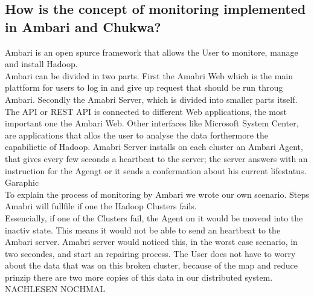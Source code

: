 \subsection{How is the concept of monitoring implemented in Ambari and Chukwa?}
Ambari is an open spurce framework that allows the User to monitore, manage and install Hadoop. 
\\
Ambari can be divided in two parts. First the Amabri Web which is the main plattform for users to log in and give up request that should be run throug Ambari. Secondly the Amabri Server, which is divided into smaller parts itself. The API or REST API is connected to different Web applications, the most important one the Ambari Web. Other interfaces like Microsoft System Center, are applications that allos the user to analyse the data forthermore the capabilietie of Hadoop. Amabri Server installs on each cluster an Ambari Agent, that gives every few seconds a heartbeat to the server; the server answers with an instruction for the Agengt or it sends a confermation about his current lifestatus. 
\\
Garaphic 
\\
To explain the process of monitoring by Ambari we wrote our own scenario. Steps Amabri will fullfile if one the Hadoop Clusters fails.
\\
Essencially, if one of the Clusters fail, the Agent on it would be movend into the inactiv state. This means it would not be able to send an heartbeat to the Ambari server. Amabri server would noticed this, in the worst case scenario, in two secondes, and start an repairing process. The User does not have to worry about the data that was on this broken cluster, because of the map and reduce prinzip there are two more copies of this data in our distributed system. NACHLESEN NOCHMAL 